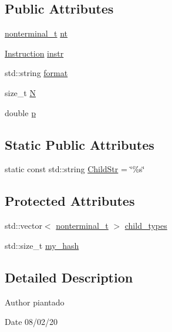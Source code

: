 \subsection*{Public Attributes}
\begin{DoxyCompactItemize}
\item 
\hyperlink{_nonterminal_8h_a1c5bfe9b903f69c83bbde5da7035fef3}{nonterminal\+\_\+t} \hyperlink{class_rule_a980385e76137909454bd6a585bd2e138}{nt}
\item 
\hyperlink{class_instruction}{Instruction} \hyperlink{class_rule_a367e578f5e1427ef04d1d77477565c67}{instr}
\item 
std\+::string \hyperlink{class_rule_aa48c15aaaf5242afea0439607f2a2177}{format}
\item 
size\+\_\+t \hyperlink{class_rule_a0a2a742af39b60831ad1ac5eb5ba7498}{N}
\item 
double \hyperlink{class_rule_acd7e4d41d59dec76f60ca16238ab391a}{p}
\end{DoxyCompactItemize}
\subsection*{Static Public Attributes}
\begin{DoxyCompactItemize}
\item 
static const std\+::string \hyperlink{class_rule_a3ffb425ebd6c508ca47234e3800f769c}{Child\+Str} = \char`\"{}\%s\char`\"{}
\end{DoxyCompactItemize}
\subsection*{Protected Attributes}
\begin{DoxyCompactItemize}
\item 
std\+::vector$<$ \hyperlink{_nonterminal_8h_a1c5bfe9b903f69c83bbde5da7035fef3}{nonterminal\+\_\+t} $>$ \hyperlink{class_rule_afdd38b9432cea46b5cea54b1bb841c07}{child\+\_\+types}
\item 
std\+::size\+\_\+t \hyperlink{class_rule_af2d873c97e2de425f14a5a980dbcc104}{my\+\_\+hash}
\end{DoxyCompactItemize}


\subsection{Detailed Description}
\begin{DoxyAuthor}{Author}
piantado 
\end{DoxyAuthor}
\begin{DoxyDate}{Date}
08/02/20 
\end{DoxyDate}


